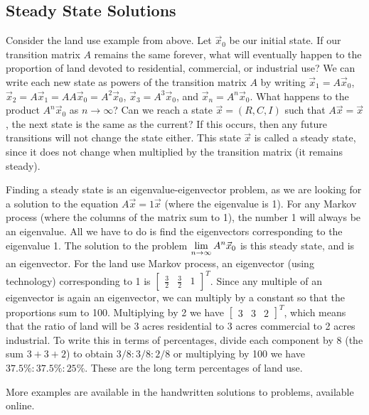 \subsection{Steady State Solutions}


Consider the land use example from above.  Let $\vec x_0$ be our initial state. If our transition matrix $A$ remains the same forever, what will eventually happen to the proportion of land devoted to residential, commercial, or industrial use? We can write each new state as powers of the transition matrix $A$ by writing 
$\vec x_{1} = A \vec x_{0}$, $\vec x_{2}=A \vec x_{1} = AA\vec x_{0} = A^2\vec x_{0}$, $\vec x_{3}= A^3\vec x_{0}$, and $\vec x_{n}= A^n\vec x_{0}$.  What happens to the product $A^n\vec x_0$ as $n\to \infty$? Can we reach a state $\vec x = (R,C,I)$ such that $A \vec x=\vec x$, the next state is the same as the current? If this occurs, then any future transitions will not change the state either. This state $\vec x$ is called a steady state, since it does not change when multiplied by the transition matrix (it remains steady). 

Finding a steady state is an eigenvalue-eigenvector problem, as we are looking for a solution to the equation $A\vec x = 1\vec x$ (where the eigenvalue is 1). For any Markov process (where the columns of the matrix sum to 1), the number 1 will always be an eigenvalue. All we have to do is find the eigenvectors corresponding to the eigenvalue 1. The solution to the problem $\displaystyle\lim_{n\to\infty}A^n \vec x_0$ is this steady state, and is an eigenvector. For the land use Markov process, an eigenvector (using technology) corresponding to 1 is $\begin{bmatrix}\frac{3}{2}&\frac32&1\end{bmatrix}^T$. Since any multiple of an eigenvector is again an eigenvector, we can multiply by a constant so that the proportions sum to 100. Multiplying by 2  we have $\begin{bmatrix}3&3&2\end{bmatrix}^T$, which means that the ratio of land will be 3 acres residential to 3 acres commercial to 2 acres industrial. To write this in terms of percentages, divide each component by 8 (the sum $3+3+2$) to obtain $3/8:3/8:2/8$ or multiplying by 100 we have $37.5\%:37.5\%:25\%$. These are the long term percentages of land use.

More examples are available in the handwritten solutions to problems, available online.






















